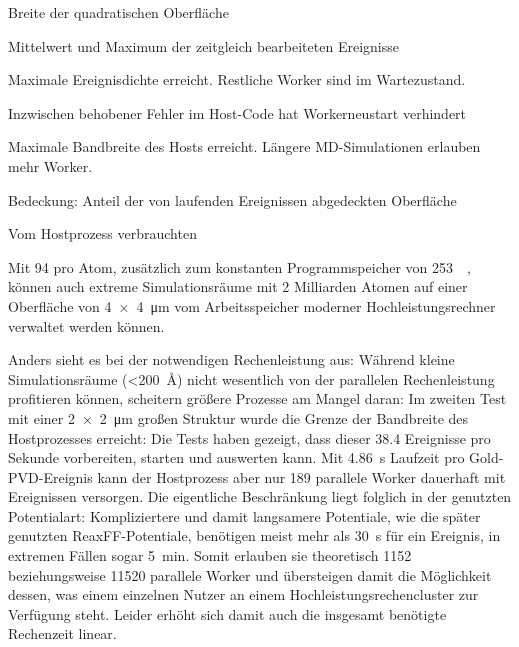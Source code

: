 \begin{table}
\begin{threeparttable}
    \begin{tablenotes}
    \item[2] Breite der quadratischen Oberfläche
    \item[a] Mittelwert und Maximum der zeitgleich bearbeiteten Ereignisse
    \item[b] Maximale Ereignisdichte erreicht.
      Restliche Worker sind im Wartezustand.
    \item[c] Inzwischen behobener Fehler im Host-Code hat Workerneustart verhindert
    \item[d] Maximale Bandbreite des Hosts erreicht.
      Längere MD-Simulationen erlauben mehr Worker.
    \item[e] Bedeckung: Anteil der von laufenden Ereignissen abgedeckten Oberfläche
    \item[f] Vom Hostprozess verbrauchten 
    \end{tablenotes}

\end{threeparttable}\end{table}

Mit \SI{94}{\byte} pro Atom, zusätzlich zum konstanten Programmspeicher von \SI{253}{\mebi\byte}, können auch extreme Simulationsräume mit 2 Milliarden Atomen auf einer Oberfläche von \SI{4x4}{\micro\meter} vom Arbeitsspeicher moderner Hochleistungsrechner verwaltet werden können.

Anders sieht es bei der notwendigen Rechenleistung aus:
Während kleine Simulationsräume (\SI{<200}{\angstrom}) nicht wesentlich von der parallelen Rechenleistung profitieren können, scheitern größere Prozesse am Mangel daran:
Im zweiten Test mit einer \SI{2x2}{\micro\meter} großen Struktur wurde die Grenze der Bandbreite des Hostprozesses erreicht:
Die Tests haben gezeigt, dass dieser \num{38.4} Ereignisse pro Sekunde vorbereiten, starten und auswerten kann.
Mit \SI{4.86}{\second} Laufzeit pro Gold-PVD-Ereignis kann der Hostprozess aber nur 189 parallele Worker dauerhaft mit Ereignissen versorgen.
Die eigentliche Beschränkung liegt folglich in der genutzten Potentialart:
Kompliziertere und damit langsamere Potentiale, wie die später genutzten ReaxFF-Potentiale, benötigen meist mehr als \SI{30}{\second} für ein Ereignis, in extremen Fällen sogar \SI{5}{\minute}.
Somit erlauben sie theoretisch \num{1152} beziehungsweise \num{11520} parallele Worker und übersteigen damit die Möglichkeit dessen, was einem einzelnen Nutzer an einem Hochleistungsrechencluster zur Verfügung steht.
Leider erhöht sich damit auch die insgesamt benötigte Rechenzeit linear.


